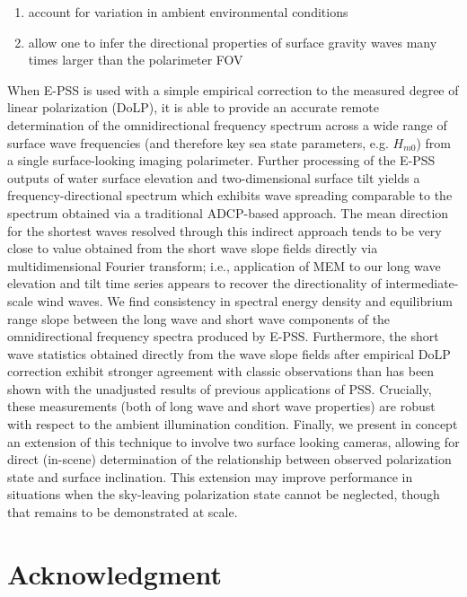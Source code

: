 \documentclass[letterpaper,journal]{IEEEtran}
\begin{document}
\begin{enumerate}
    \item account for variation in ambient environmental conditions
    \item allow one to infer the directional properties of surface gravity waves many times larger than the polarimeter FOV
\end{enumerate}

\noindent When E-PSS is used with a simple empirical correction to the measured degree of linear polarization (DoLP), it is able to provide an accurate remote determination of the omnidirectional frequency spectrum across a wide range of surface wave frequencies (and therefore key sea state parameters, e.g. $H_{m0}$) from a single surface-looking imaging polarimeter. Further processing of the E-PSS outputs of water surface elevation and two-dimensional surface tilt yields a frequency-directional spectrum which exhibits wave spreading comparable to the spectrum obtained via a traditional ADCP-based approach. The mean direction for the shortest waves resolved through this indirect approach tends to be very close to value obtained from the short wave slope fields directly via multidimensional Fourier transform; i.e., application of MEM to our long wave elevation and tilt time series appears to recover the directionality of intermediate-scale wind waves. We find consistency in spectral energy density and equilibrium range slope between the long wave and short wave components of the omnidirectional frequency spectra produced by E-PSS. Furthermore, the short wave statistics obtained directly from the wave slope fields after empirical DoLP correction exhibit stronger agreement with classic observations than has been shown with the unadjusted results of previous applications of PSS. Crucially, these measurements (both of long wave and short wave properties) are robust with respect to the ambient illumination condition. Finally, we present in concept an extension of this technique to involve two surface looking cameras, allowing for direct (in-scene) determination of the relationship between observed polarization state and surface inclination. This extension may improve performance in situations when the sky-leaving polarization state cannot be neglected, though that remains to be demonstrated at scale.

\section*{Acknowledgment}
\end{document}
